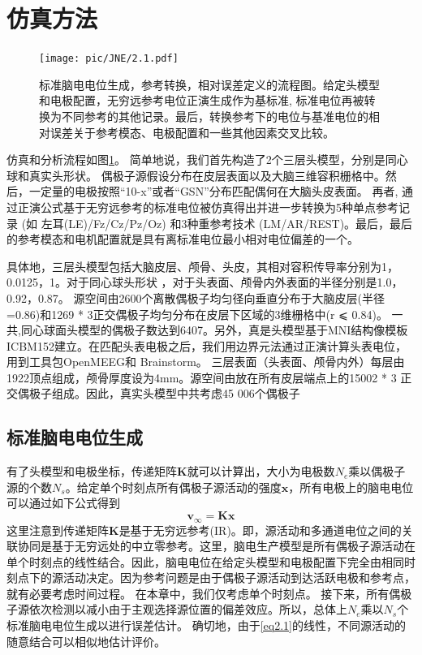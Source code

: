 \section{仿真方法}
\begin{figure}[h!]
	\centering
	\texttt{[image: pic/JNE/2.1.pdf]}
	\caption{标准脑电电位生成，参考转换，相对误差定义的流程图。给定头模型和电极配置，无穷远参考电位正演生成作为基标准, 标准电位再被转换为不同参考的其他记录。最后，转换参考下的电位与基准电位的相对误差关于参考模态、电极配置和一些其他因素交叉比较。}
	\label{2.1}
\end{figure}
仿真和分析流程如图\ref{2.1}。 简单地说，我们首先构造了2个三层头模型，分别是同心球和真实头形状。 偶极子源假设分布在皮层表面以及大脑三维容积栅格中。然后，一定量的电极按照“10-x”或者“GSN”分布匹配偶何在大脑头皮表面。 再者, 通过正演公式基于无穷远参考的标准电位被仿真得出并进一步转换为5种单点参考记录 (如 左耳(LE)/Fz/Cz/Pz/Oz) 和3种重参考技术 (LM/AR/REST)。最后，最后的参考模态和电机配置就是具有离标准电位最小相对电位偏差的一个。

具体地，三层头模型包括大脑皮层、颅骨、头皮，其相对容积传导率分别为1，0.0125，1。对于同心球头形状 ，对于头表面、颅骨内外表面的半径分别是1.0，0.92，0.87。 源空间由2600个离散偶极子均匀径向垂直分布于大脑皮层(半径=0.86)和1269 * 3正交偶极子均匀分布在皮层下区域的3维栅格中(r ⩽ 0.84)。 一共,同心球面头模型的偶极子数达到6407。另外，真是头模型基于MNI结构像模板ICBM152建立。在匹配头表电极之后，我们用边界元法通过正演计算头表电位，用到工具包OpenMEEG和 Brainstorm。 三层表面（头表面、颅骨内外）每层由1922顶点组成，颅骨厚度设为4mm。源空间由放在所有皮层端点上的15002 * 3 正交偶极子组成。因此，真实头模型中共考虑45 006个偶极子

\subsection{标准脑电电位生成}
有了头模型和电极坐标，传递矩阵$\mathbf{K}$就可以计算出，大小为电极数$N_e$乘以偶极子源的个数$N_s$。给定单个时刻点所有偶极子源活动的强度$\mathbf{x}$，所有电极上的脑电电位可以通过如下公式得到
\begin{equation}\label{eq2.1}
\mathbf{v}_{\infty}=\mathbf{Kx}
\end{equation}
这里注意到传递矩阵$\mathbf{K}$是基于无穷远参考(IR)。即，源活动和多通道电位之间的关联协同是基于无穷远处的中立零参考。这里，脑电生产模型是所有偶极子源活动在单个时刻点的线性结合。因此，脑电电位在给定头模型和电极配置下完全由相同时刻点下的源活动决定。因为参考问题是由于偶极子源活动到达活跃电极和参考点，就有必要考虑时间过程。 在本章中，我们仅考虑单个时刻点。 接下来，所有偶极子源依次检测以减小由于主观选择源位置的偏差效应。所以，总体上$N_e$乘以$N_s$个标准脑电电位生成以进行误差估计。 确切地，由于\eqref{eq2.1}的线性，不同源活动的随意结合可以相似地估计评价。
